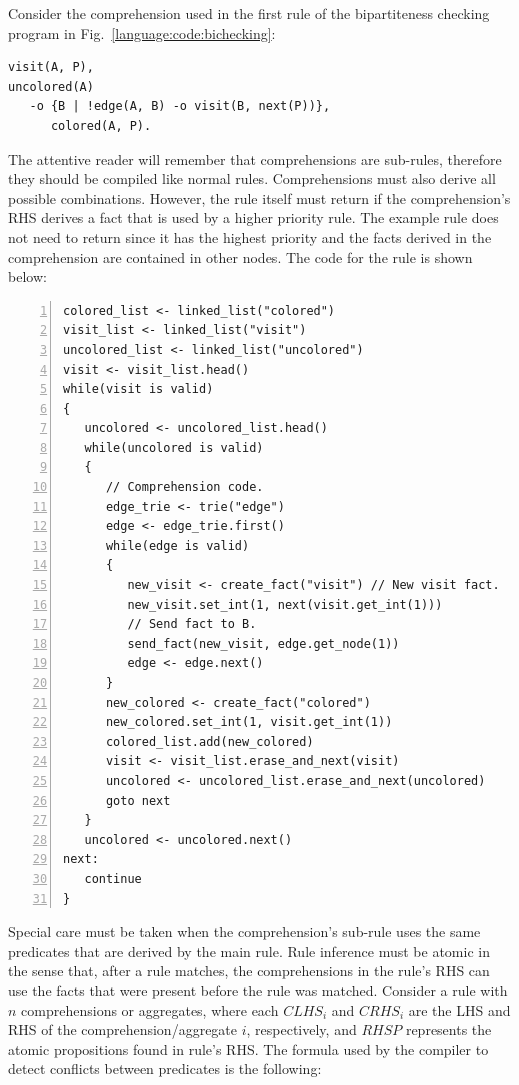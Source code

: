 Consider the comprehension used in the first rule of the bipartiteness checking
program in Fig.~\ref{language:code:bichecking}:

\begin{Verbatim}[fontsize=\codesize]
visit(A, P),
uncolored(A)
   -o {B | !edge(A, B) -o visit(B, next(P))},
      colored(A, P).
\end{Verbatim}

The attentive reader will remember that comprehensions are sub-rules, therefore
they should be compiled like normal rules. Comprehensions must also derive all
possible combinations. However, the rule itself must return if the
comprehension's RHS derives a fact that is used by a higher priority rule. The
example rule does not need to return since it has the highest priority and the
 facts derived in the comprehension are contained in other nodes.
The code for the rule is shown below:

\begin{Verbatim}[numbers=left,fontsize=\codesize]
colored_list <- linked_list("colored")
visit_list <- linked_list("visit")
uncolored_list <- linked_list("uncolored")
visit <- visit_list.head()
while(visit is valid)
{
   uncolored <- uncolored_list.head()
   while(uncolored is valid)
   {
      // Comprehension code.
      edge_trie <- trie("edge")
      edge <- edge_trie.first()
      while(edge is valid)
      {
         new_visit <- create_fact("visit") // New visit fact.
         new_visit.set_int(1, next(visit.get_int(1)))
         // Send fact to B.
         send_fact(new_visit, edge.get_node(1))
         edge <- edge.next()
      }
      new_colored <- create_fact("colored")
      new_colored.set_int(1, visit.get_int(1))
      colored_list.add(new_colored)
      visit <- visit_list.erase_and_next(visit)
      uncolored <- uncolored_list.erase_and_next(uncolored)
      goto next
   }
   uncolored <- uncolored.next()
next:
   continue
}
\end{Verbatim}

Special care must be taken when the comprehension's sub-rule uses the same
predicates that are derived by the main rule. Rule inference must be atomic in
the sense that, after a rule matches, the comprehensions in the rule's RHS can
use the facts that were present before the rule was matched. Consider a rule
with $n$ comprehensions or aggregates, where each $CLHS_i$ and $CRHS_i$ are the
LHS and RHS of the comprehension/aggregate $i$, respectively, and $RHSP$
represents the atomic propositions found in rule's RHS. The formula used by the
compiler to detect conflicts between predicates is the following:

